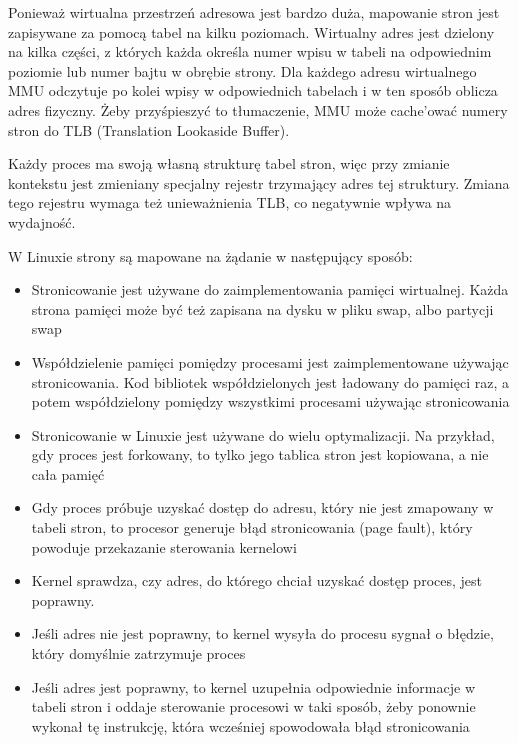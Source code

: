 Ponieważ wirtualna przestrzeń adresowa jest bardzo duża, mapowanie stron jest zapisywane za pomocą tabel na kilku poziomach. Wirtualny adres jest dzielony na kilka części, z których każda określa numer wpisu w tabeli na odpowiednim poziomie lub numer bajtu w obrębie strony. Dla każdego adresu wirtualnego MMU odczytuje po kolei wpisy w odpowiednich tabelach i w ten sposób oblicza adres fizyczny. Żeby przyśpieszyć to tłumaczenie, MMU może cache'ować numery stron do TLB (Translation Lookaside Buffer).

Każdy proces ma swoją własną strukturę tabel stron, więc przy zmianie kontekstu jest zmieniany specjalny rejestr trzymający adres tej struktury. Zmiana tego rejestru wymaga też unieważnienia TLB, co negatywnie wpływa na wydajność.

W Linuxie strony są mapowane na żądanie w następujący sposób:
\begin{itemize}
    \item Stronicowanie jest używane do zaimplementowania pamięci wirtualnej. Każda strona pamięci może być też zapisana na dysku w pliku swap, albo partycji swap
    \item Współdzielenie pamięci pomiędzy procesami jest zaimplementowane używając stronicowania. Kod bibliotek współdzielonych jest ładowany do pamięci raz, a potem współdzielony pomiędzy wszystkimi procesami używając stronicowania
    \item Stronicowanie w Linuxie jest używane do wielu optymalizacji. Na przykład, gdy proces jest forkowany, to tylko jego tablica stron jest kopiowana, a nie cała pamięć
    \item Gdy proces próbuje uzyskać dostęp do adresu, który nie jest zmapowany w tabeli stron, to procesor generuje błąd stronicowania (page fault), który powoduje przekazanie sterowania kernelowi
    \item Kernel sprawdza, czy adres, do którego chciał uzyskać dostęp proces, jest poprawny.
    \item Jeśli adres nie jest poprawny, to kernel wysyła do procesu sygnał o błędzie, który domyślnie zatrzymuje proces
    \item Jeśli adres jest poprawny, to kernel uzupełnia odpowiednie informacje w tabeli stron i oddaje sterowanie procesowi w taki sposób, żeby ponownie wykonał tę instrukcję, która wcześniej spowodowała błąd stronicowania
\end{itemize}
